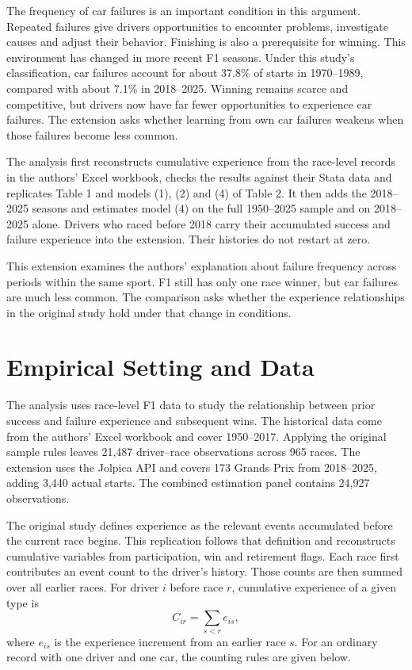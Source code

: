 \documentclass[11pt,letterpaper]{article}
\begin{document}
The frequency of car failures is an important condition in this argument. Repeated failures give drivers opportunities to encounter problems, investigate causes and adjust their behavior. Finishing is also a prerequisite for winning. This environment has changed in more recent F1 seasons. Under this study's classification, car failures account for about 37.8\% of starts in 1970--1989, compared with about 7.1\% in 2018--2025. Winning remains scarce and competitive, but drivers now have far fewer opportunities to experience car failures. The extension asks whether learning from own car failures weakens when those failures become less common.

The analysis first reconstructs cumulative experience from the race-level records in the authors' Excel workbook, checks the results against their Stata data and replicates Table 1 and models (1), (2) and (4) of Table 2. It then adds the 2018--2025 seasons and estimates model (4) on the full 1950--2025 sample and on 2018--2025 alone. Drivers who raced before 2018 carry their accumulated success and failure experience into the extension. Their histories do not restart at zero.

This extension examines the authors' explanation about failure frequency across periods within the same sport. F1 still has only one race winner, but car failures are much less common. The comparison asks whether the experience relationships in the original study hold under that change in conditions.

\section{Empirical Setting and Data}

The analysis uses race-level F1 data to study the relationship between prior success and failure experience and subsequent wins. The historical data come from the authors' Excel workbook and cover 1950--2017. Applying the original sample rules leaves 21,487 driver--race observations across 965 races. The extension uses the Jolpica API and covers 173 Grands Prix from 2018--2025, adding 3,440 actual starts. The combined estimation panel contains 24,927 observations.

The original study defines experience as the relevant events accumulated before the current race begins. This replication follows that definition and reconstructs cumulative variables from participation, win and retirement flags. Each race first contributes an event count to the driver's history. Those counts are then summed over all earlier races. For driver $i$ before race $r$, cumulative experience of a given type is
\[
C_{ir}=\sum_{s<r}e_{is},
\]
where $e_{is}$ is the experience increment from an earlier race $s$. For an ordinary record with one driver and one car, the counting rules are given below.
\end{document}
